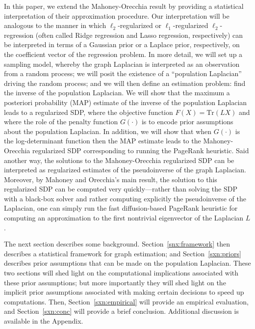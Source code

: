 \documentclass[12pt]{article}
\theoremstyle{plain}
\begin{document}
\vspace{-1mm}
In this paper, we extend the Mahoney-Orecchia result by providing a
statistical interpretation of their approximation procedure.
Our interpretation will be analogous to the manner in which
$\ell_2$-regularized or $\ell_1$-regularized $\ell_2$-regression (often
called Ridge regression and Lasso regression, respectively) can be
interpreted in terms of a Gaussian prior or a Laplace prior, respectively,
on the coefficient vector of the regression problem.
In more detail, we will set up a sampling model, whereby the graph Laplacian
is interpreted as an observation from a random process; we will posit the
existence of a ``population Laplacian'' driving the random process; and we
will then define an estimation problem: find the inverse of the population
Laplacian.
We will show that the maximum a posteriori probability (MAP) estimate of 
the inverse of the population Laplacian leads to a regularized SDP, where 
the objective function $F(X)=\mathrm{Tr}(L X)$ and where the role of the 
penalty function $G(\cdot)$ is to encode prior assumptions about the 
population Laplacian.
In addition, we will show that when $G(\cdot)$ is the log-determinant 
function then the MAP estimate leads to the Mahoney-Orecchia regularized 
SDP corresponding to running the PageRank heuristic.
Said another way, the solutions to the Mahoney-Orecchia regularized SDP can 
be interpreted as regularized estimates of the pseudoinverse of the graph 
Laplacian.
Moreover, by Mahoney and Orecchia's main result, the solution to this 
regularized SDP can be computed very quickly---rather than solving 
the SDP with a black-box solver and rather computing explicitly the 
pseudoinverse of the Laplacian, one can simply run the fast diffusion-based 
PageRank heuristic for computing an approximation to the first nontrivial 
eigenvector of the Laplacian $L$.

\vspace{-1mm}
The next section describes some background. 
Section~\ref{snx:framework} then describes a statistical framework for graph
estimation; and Section~\ref{sxn:priors} describes prior assumptions that
can be made on the population Laplacian.
These two sections will shed light on the computational implications
associated with these prior assumptions; but more importantly they will shed
light on the implicit prior assumptions associated with making certain
decisions to speed up computations.
Then, Section~\ref{sxn:empirical} will provide an empirical evaluation,
and 
Section~\ref{sxn:conc} will provide a brief conclusion.
Additional discussion is available in the Appendix.
\end{document}
